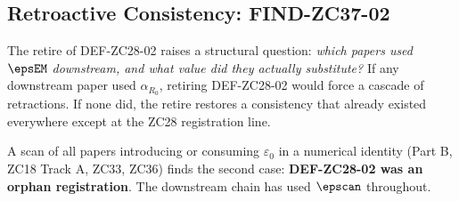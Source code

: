 \documentclass[12pt, a4paper]{article}
\begin{document}
\subsection{Retroactive Consistency: FIND-ZC37-02}
\label{sec:retroactive}

The retire of DEF-ZC28-02 raises a structural question:
\emph{which papers used $\epsEM$ downstream, and what value
did they actually substitute?} If any downstream paper used
$\alpha_{R_0}$, retiring DEF-ZC28-02 would force a cascade of
retractions. If none did, the retire restores a consistency
that already existed everywhere except at the ZC28 registration
line.

A scan of all papers introducing or consuming $\varepsilon_0$
in a numerical identity (Part B, ZC18 Track A, ZC33, ZC36)
finds the second case: \textbf{DEF-ZC28-02 was an orphan
registration}. The downstream chain has used $\epscan$
throughout.
\end{document}
